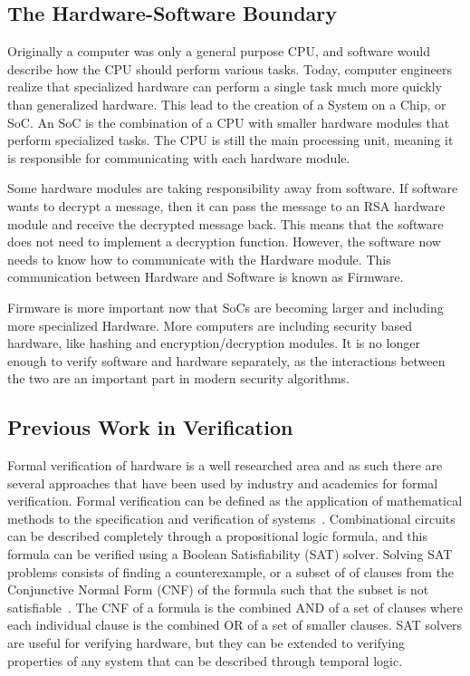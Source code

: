 \documentclass[../report.tex]{subfiles}
\begin{document}
\subsection{The Hardware-Software Boundary}

Originally a computer was only a general purpose CPU, and software would
describe how the CPU should perform various tasks.
Today, computer engineers realize that specialized hardware can perform a single
task much more quickly than generalized hardware.
This lead to the creation of a System on a Chip, or SoC. An SoC is the
combination of a CPU with smaller hardware modules that perform specialized
tasks.
The CPU is still the main processing unit, meaning it is responsible for
communicating with each hardware module.

Some hardware modules are taking responsibility away from software.
If software wants to decrypt a message, then it can pass the message to an RSA
hardware module and receive the decrypted message back.
This means that the software does not need to implement a decryption function.
However, the software now needs to know how to communicate with the Hardware
module. This communication between Hardware and Software is known as Firmware.

Firmware is more important now that SoCs are becoming larger and including more
specialized Hardware. 
More computers are including security based hardware, like hashing and encryption/decryption modules.
It is no longer enough to verify software and hardware separately, as the
interactions between the two are an important part in modern security
algorithms.

\subsection{Previous Work in Verification}

Formal verification of hardware is a well researched area and as such there are several approaches that have been used by industry and academics for formal verification.
Formal verification can be defined as the application of mathematical methods to the specification and verification of systems~\cite{greenstreet}.
Combinational circuits can be described completely through a propositional logic formula, and this formula can be verified using a Boolean Satisfiability (SAT) solver.
Solving SAT problems consists of finding a counterexample, or a subset of of clauses from the Conjunctive Normal Form (CNF) of the formula such that the subset is not satisfiable~\cite{validating-sat}.
The CNF of a formula is the combined AND of a set of clauses where each individual clause is the combined OR of a set of smaller clauses.
SAT solvers are useful for verifying hardware, but they can be extended to verifying properties of any system that can be described through temporal logic.
\end{document}
